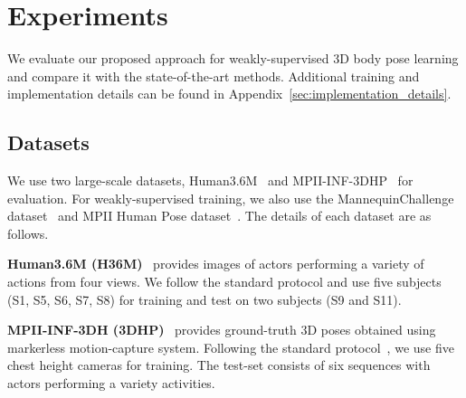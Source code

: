 \section{Experiments}


We evaluate our proposed approach for weakly-supervised 3D body pose learning and compare it with the state-of-the-art methods.
Additional training and implementation details can be found in Appendix~\ref{sec:implementation_details}.


\subsection{Datasets}
We use two large-scale datasets, Human3.6M~\cite{h36m_pami} and MPII-INF-3DHP~\cite{mono20173dhp} for evaluation. For weakly-supervised training, we also use the MannequinChallenge dataset~\cite{li2019mannequin} 
and 
MPII Human Pose dataset~\cite{andriluka14cvpr}. The details of each dataset are as follows.

\noindent\textbf{Human3.6M (H36M)}~\cite{h36m_pami} 
provides images of actors performing a variety of actions from four views. 
We follow the standard protocol and use five subjects (S1, S5, S6, S7, S8) for training and test on two subjects (S9 and S11).

\noindent\textbf{MPII-INF-3DH (3DHP)}~\cite{mono20173dhp} provides ground-truth 3D poses obtained using markerless motion-capture system.
Following the standard protocol~\cite{mono20173dhp}, we use five chest height cameras for training. The test-set consists of six sequences with actors performing a variety activities. 

